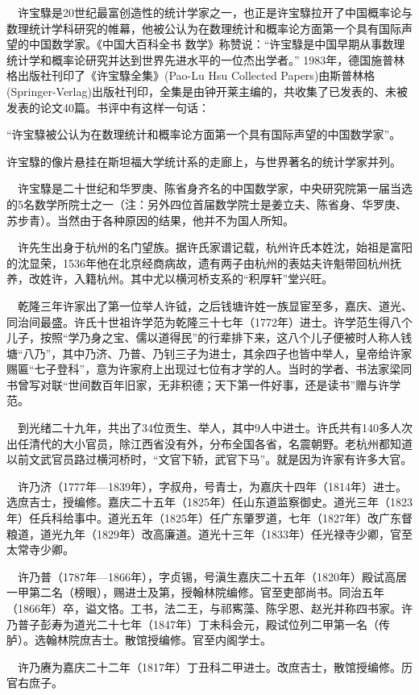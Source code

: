 \begin{frame}
	$\quad$许宝騄是20世纪最富创造性的统计学家之一，也正是许宝騄拉开了中国概率论与数理统计学科研究的帷幕，他被公认为在数理统计和概率论方面第一个具有国际声望的中国数学家。《中国大百科全书 数学》称赞说：“许宝騄是中国早期从事数理统计学和概率论研究并达到世界先进水平的一位杰出学者。” 1983年，德国施普林格出版社刊印了《许宝騄全集》(Pao-Lu Hsu Collected Papers)由斯普林格(Springer-Verlag)出版社刊印，全集是由钟开莱主编的，共收集了已发表的、未被发表的论文40篇。书评中有这样一句话：
	
	“许宝騄被公认为在数理统计和概率论方面第一个具有国际声望的中国数学家”。
	
	许宝騄的像片悬挂在斯坦福大学统计系的走廊上，与世界著名的统计学家并列。
	
	$\quad$许宝騄是二十世纪和华罗庚、陈省身齐名的中国数学家，中央研究院第一届当选的5名数学所院士之一（注：另外四位首届数学院士是姜立夫、陈省身、华罗庚、苏步青）。当然由于各种原因的结果，他并不为国人所知。
\end{frame}

\begin{frame}
	$\quad$许先生出身于杭州的名门望族。据许氏家谱记载，杭州许氏本姓沈，始祖是富阳的沈显荣，1536年他在北京经商病故，遗有两子由杭州的表姑夫许魁带回杭州抚养，改姓许，入籍杭州。其中尤以横河桥支系的“积厚轩”堂兴旺。 
	
	$\quad$乾隆三年许家出了第一位举人许钺，之后钱塘许姓一族显宦至多，嘉庆、道光、同治间最盛。许氏十世祖许学范为乾隆三十七年（1772年）进士。许学范生得八个儿子，按照“学乃身之宝、儒以道得民”的行辈排下来，这八个儿子便被时人称人钱塘“八乃”，其中乃济、乃普、乃钊三子为进士，其余四子也皆中举人，皇帝给许家赐匾“七子登科”，意为许家府上出现过七位有才学的人。当时的学者、书法家梁同书曾写对联“世间数百年旧家，无非积德；天下第一件好事，还是读书”赠与许学范。
	
	$\quad$到光绪二十九年，共出了34位贡生、举人，其中9人中进士。许氏共有140多人次出任清代的大小官员，除江西省没有外，分布全国各省，名震朝野。老杭州都知道以前文武官员路过横河桥时，“文官下轿，武官下马”。就是因为许家有许多大官。
\end{frame}

\begin{frame}
	$\quad$许乃济（1777年—1839年），字叔舟，号青士，为嘉庆十四年（1814年）进士。选庶吉士，授编修。嘉庆二十五年（1825年）任山东道监察御史。道光三年（1823年）任兵科给事中。道光五年（1825年）任广东肇罗道，七年（1827年）改广东督粮道，道光九年（1829年）改高廉道。道光十三年（1833年）任光禄寺少卿，官至太常寺少卿。
	
	$\quad$许乃普（1787年—1866年），字贞锡，号滇生嘉庆二十五年（1820年）殿试高居一甲第二名（榜眼），赐进士及第，授翰林院编修。官至吏部尚书。同治五年（1866年）卒，谥文恪。工书，法二王，与祁寯藻、陈孚恩、赵光并称四书家。许乃普子彭寿为道光二十七年（1847年）丁未科会元，殿试位列二甲第一名（传胪）。选翰林院庶吉士。散馆授编修。官至内阁学士。
	
	$\quad$许乃赓为嘉庆二十二年（1817年）丁丑科二甲进士。改庶吉士，散馆授编修。历官右庶子。
\end{frame}

